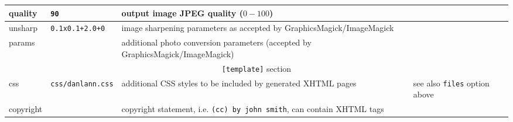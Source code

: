 \documentclass{article}
\begin{document}
\begin{longtable}{|l|p{3cm}|p{6cm}|p{3cm}|}
\hline
quality & \verb+90+ & output image JPEG quality ($0-100$) &  \\
\hline
unsharp & \verb-0.1x0.1+2.0+0- & image sharpening parameters as accepted by GraphicsMagick/ImageMagick &  \\
\hline
params & & additional photo conversion parameters (accepted by GraphicsMagick/ImageMagick) &  \\
\hline
\hline
\multicolumn{4}{|c|}{\texttt{[template]} section} \\
\hline
\hline
css & \verb+css/danlann.css+ & additional CSS styles to be included by generated XHTML pages & see also \texttt{files} option above\\
\hline
copyright & & copyright statement, i.e. \texttt{(cc) by john smith}, can contain XHTML tags & \\
\hline
\end{longtable}
\end{document}
